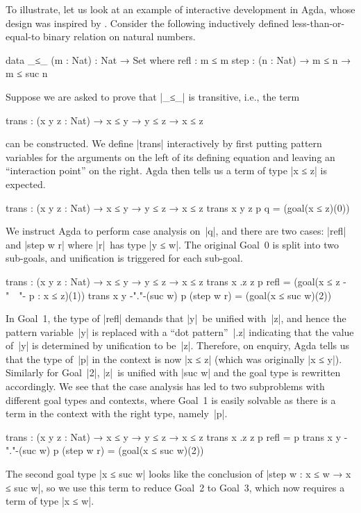 To illustrate, let us look at an example of interactive development in Agda, whose design was inspired by \citet{McBride-view}.
Consider the following inductively defined less-than-or-equal-to binary relation on natural numbers.
\begin{code}
data _≤_ (m : Nat) : Nat → Set where
  refl : m ≤ m
  step : (n : Nat) → m ≤ n → m ≤ suc n
\end{code}
Suppose we are asked to prove that |_≤_| is transitive, i.e., the term
\begin{code}
trans : (x y z : Nat) → x ≤ y → y ≤ z → x ≤ z
\end{code}
can be constructed.
We define |trans| interactively by first putting pattern variables for the arguments on the left of its defining equation and leaving an ``interaction point'' on the right.
Agda then tells us a term of type |x ≤ z| is expected.
\begin{code}
trans : (x y z : Nat) → x ≤ y → y ≤ z → x ≤ z
trans x y z p q = (goal(x ≤ z)(0))
\end{code}
We instruct Agda to perform case analysis on~|q|, and there are two cases: |refl| and |step w r| where |r|~has type |y ≤ w|.
The original Goal~0 is split into two sub-goals, and unification is triggered for each sub-goal.
\begin{code}
trans : (x y z : Nat) → x ≤ y → y ≤ z → x ≤ z
trans x  .z  z               p refl        = (goal(x ≤ z {-"~\Vert~"-} p : x ≤ z)(1))
trans x  y   {-"."-}(suc w)  p (step w r)  = (goal(x ≤ suc w)(2))
\end{code}
In Goal~1, the type of |refl| demands that |y|~be unified with~|z|, and hence the pattern variable~|y| is replaced with a ``dot pattern''~|.z| indicating that the value of~|y| is determined by unification to be~|z|.
Therefore, on enquiry, Agda tells us that the type of~|p| in the context is now |x ≤ z| (which was originally |x ≤ y|).
Similarly for Goal~|2|, |z|~is unified with |suc w| and the goal type is rewritten accordingly.
We see that the case analysis has led to two subproblems with different goal types and contexts, where Goal~1 is easily solvable as there is a term in the context with the right type, namely~|p|.
\begin{code}
trans : (x y z : Nat) → x ≤ y → y ≤ z → x ≤ z
trans x  .z  z               p refl        = p
trans x  y   {-"."-}(suc w)  p (step w r)  = (goal(x ≤ suc w)(2))
\end{code}
The second goal type |x ≤ suc w| looks like the conclusion of |step w : x ≤ w → x ≤ suc w|, so we use this term to reduce Goal~2 to Goal~3, which now requires a term of type |x ≤ w|.
